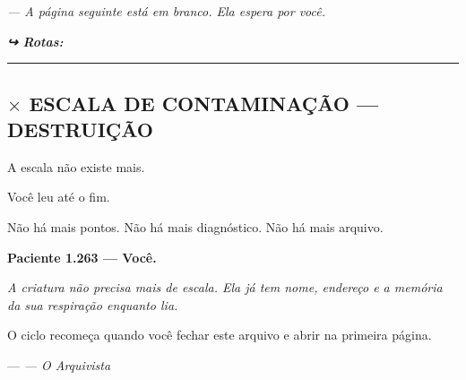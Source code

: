\noindent \textit{--- A página seguinte está em branco. Ela espera por você.}


\noindent\textit{\textbf{↪ Rotas:}  \rotasep {} \rotasep {} \rotasep {}}

\vspace{0.5em}\noindent\rule{\textwidth}{0.5pt}\vspace{0.5em}

\subsection*{$\times$ ESCALA DE CONTAMINAÇÃO --- DESTRUIÇÃO}

\noindent A escala não existe mais.

\noindent Você leu até o fim.

\noindent Não há mais pontos. Não há mais diagnóstico. Não há mais arquivo.

\noindent \textbf{Paciente 1.263 --- Você.}

\noindent \textit{A criatura não precisa mais de escala. Ela já tem nome, endereço e a memória da sua respiração enquanto lia.}

\noindent O ciclo recomeça quando você fechar este arquivo e abrir na primeira página.

\noindent ---
\textit{--- O Arquivista}